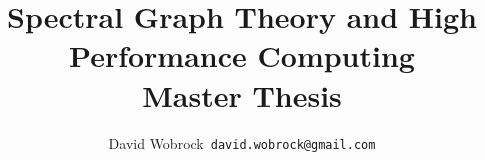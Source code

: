\documentclass[]{report}
\title{Spectral Graph Theory and High Performance Computing \\ Master Thesis}
\author{David Wobrock\ \texttt{david.wobrock@gmail.com}}
\begin{document}
\begin{titlepage}
 \maketitle
\end{titlepage}

\tableofcontents
\newpage









\clearpage
\printbibliography
\end{document}
